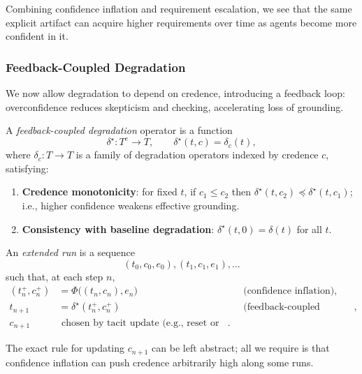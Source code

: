 Combining confidence inflation and requirement escalation, we see that
the same explicit artifact can acquire higher requirements over time as
agents become more confident in it.

\subsubsection{Feedback-Coupled Degradation}

We now allow degradation to depend on credence, introducing a feedback
loop: overconfidence reduces skepticism and checking, accelerating loss
of grounding.

\begin{definition}
A \emph{feedback-coupled degradation} operator is a function
\[
\delta^\star : T^e \to T,\qquad
\delta^\star(t,c) = \delta_c(t),
\]
where \(\delta_c : T \to T\) is a family of degradation operators
indexed by credence \(c\), satisfying:
\begin{enumerate}
  \item \textbf{Credence monotonicity}:
        for fixed \(t\), if \(c_1 \le c_2\) then
        \(\delta^\star(t,c_2) \preceq \delta^\star(t,c_1)\);
        i.e., higher confidence weakens effective grounding.
  \item \textbf{Consistency with baseline degradation}:
        \(\delta^\star(t,0) = \delta(t)\) for all \(t\).
\end{enumerate}
\end{definition}

\begin{definition}
An \emph{extended run} is a sequence
\[
(t_0,c_0,e_0), (t_1,c_1,e_1), \dots
\]
such that, at each step \(n\),
\begin{align*}
(t_n^+, c_n^+) &= \Phi\bigl((t_n,c_n), e_n\bigr)
      &&\text{(confidence inflation)},\\
t_{n+1} &= \delta^\star(t_n^+, c_n^+)
      &&\text{(feedback-coupled degradation)},\\
c_{n+1} &\text{ chosen by tacit update (e.g., reset or carry-over)}.
\end{align*}
\end{definition}

The exact rule for updating \(c_{n+1}\) can be left abstract; all we
require is that confidence inflation can push credence arbitrarily high
along some runs.

